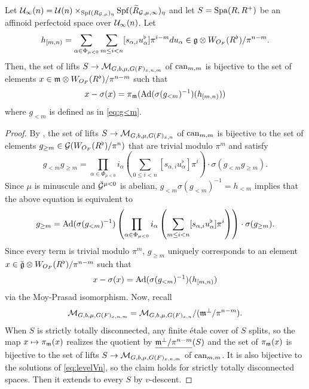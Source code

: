 \documentclass[12pt,reqno]{amsart}
\begin{document}
\begin{prop} \label{lem:levelVn}
    Let ${\mathcal{U}}_\infty(n) = {\mathcal{U}}(n)\times_{{\operatorname{Spf}}(R_{{\mathcal{G}}, \mu})_\eta} {\operatorname{Spf}}({\widetilde{R}}_{{\mathcal{G}},\mu,\infty})_\eta$ and let $S = {\operatorname{Spa}}(R,R^+)$ be an affinoid perfectoid space over ${\mathcal{U}}_\infty(n)$. Let
    \begin{equation} \label{eq:definition_h_mn}
        h_{[m, n)} = \sum_{\alpha \in \Phi_{\mu<0}} \sum_{m \leq i < n} [s_{\alpha,i}u_\alpha^\flat] \pi^{i-m} du_\alpha \in {\mathfrak{g}} \otimes W_{O_F}(R^\flat)/\pi^{n - m}. 
    \end{equation}
    Then, the set of lifts $S \to {\mathcal{M}}_{G, b, \mu, G(F)_{x, n, m}}$ of ${\operatorname{can}}_{m, m}$ is bijective to the set of elements $x \in {\mathfrak{m}} \otimes W_{O_F}(R^\flat) / \pi^{n-m}$ such that 
    \begin{equation}
        x - \sigma(x) = \pi_{{\mathfrak{m}}}({\operatorname{Ad}}(\sigma(g_{<m})^{-1})(h_{[m, n)})) \label{eq:levelVn}
    \end{equation}
    where $g_{<m}$ is defined as in \eqref{eq:g<m}. 
\end{prop}
\begin{proof}
    By , the set of lifts $S \to {\mathcal{M}}_{G, b, \mu, G(F)_{x, n}}$ of ${\operatorname{can}}_{m, m}$ is bijective to the set of elements $g_{\geq m}\in {\mathcal{G}}(W_{O_F}(R^\flat)/\pi^n)$ that are trivial modulo $\pi^{m}$ and satisfy
    \[
        g_{<m} g_{\geq m} = \prod_{\alpha \in \Phi_{\mu<0}} i_\alpha\left(\sum_{0 \leq i < n} [s_{\alpha,i}u_\alpha^\flat]\pi^i\right) \cdot \sigma(g_{<m}g_{\geq m}). 
    \]
    Since $\mu$ is minuscule and $\breve{{\mathcal{G}}}^{\mu < 0}$ is abelian, $g_{<m} \sigma(g_{<m})^{-1} = h_{<m}$ implies that the above equation is equivalent to
    \[
        g_{\geq m} = {\operatorname{Ad}}(\sigma(g_{<m})^{-1})\left(\prod_{\alpha \in \Phi_{\mu<0}} i_\alpha\left(\sum_{m \leq i < n} [s_{\alpha,i}u_\alpha^\flat]\pi^i\right) \right)\cdot \sigma(g_{\geq m}). 
    \]
    Since every term is trivial modulo $\pi^{m}$, $g_{\geq m}$ uniquely corresponds to an element $x \in {\mathfrak{\breve{g}}} \otimes W_{O_F}(R^\flat)/\pi^{n -m}$ such that 
    \[
        x - \sigma(x) = {\operatorname{Ad}}(\sigma(g_{<m})^{-1})(h_{[m, n)})
    \]
    via the Moy-Prasad isomorphism. Now, recall  
    \[
        {\mathcal{M}}_{G, b, \mu, G(F)_{x, n, m}} = {\mathcal{M}}_{G, b, \mu, G(F)_{x, n}} / ({\mathfrak{m}}^\perp/\pi^{n-m}). 
    \]
    When $S$ is strictly totally disconnected, any finite \'{e}tale cover of $S$ splits, so the map $x \mapsto \pi_{{\mathfrak{m}}}(x)$ realizes the quotient by $\underline{{\mathfrak{m}}^\perp/\pi^{n-m}}(S)$ and the set of $\pi_{{\mathfrak{m}}}(x)$ is bijective to the set of lifts $S \to {\mathcal{M}}_{G, b, \mu, G(F)_{x, n, m}}$ of ${\operatorname{can}}_{m, m}$. It is also bijective to the solutions of \eqref{eq:levelVn}, so the claim holds for strictly totally disconnected spaces. Then it extends to every $S$ by $v$-descent. 
\end{proof}
\end{document}
